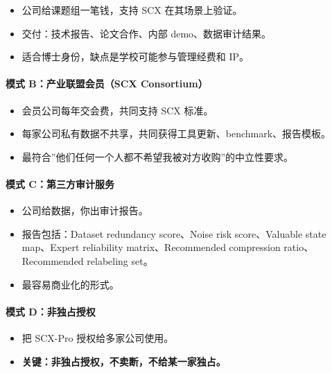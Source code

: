 \documentclass[
  12pt,
]{ctexart}
\providecommand{\tightlist}{%
  \setlength{\itemsep}{0pt}\setlength{\parskip}{0pt}}
\begin{document}
\begin{itemize}
\tightlist
\item
  公司给课题组一笔钱，支持 SCX 在其场景上验证。
\item
  交付：技术报告、论文合作、内部 demo、数据审计结果。
\item
  适合博士身份，缺点是学校可能参与管理经费和 IP。
\end{itemize}

\paragraph{模式 B：产业联盟会员（SCX
Consortium）}\label{ux6a21ux5f0f-bux4ea7ux4e1aux8054ux76dfux4f1aux5458scx-consortium}

\begin{itemize}
\tightlist
\item
  会员公司每年交会费，共同支持 SCX 标准。
\item
  每家公司私有数据不共享，共同获得工具更新、benchmark、报告模板。
\item
  最符合''他们任何一个人都不希望我被对方收购''的中立性要求。
\end{itemize}

\paragraph{模式
C：第三方审计服务}\label{ux6a21ux5f0f-cux7b2cux4e09ux65b9ux5ba1ux8ba1ux670dux52a1}

\begin{itemize}
\tightlist
\item
  公司给数据，你出审计报告。
\item
  报告包括：Dataset redundancy score、Noise risk score、Valuable state
  map、Expert reliability matrix、Recommended compression
  ratio、Recommended relabeling set。
\item
  最容易商业化的形式。
\end{itemize}

\paragraph{模式
D：非独占授权}\label{ux6a21ux5f0f-dux975eux72ecux5360ux6388ux6743}

\begin{itemize}
\tightlist
\item
  把 SCX-Pro 授权给多家公司使用。
\item
  \textbf{关键：非独占授权，不卖断，不给某一家独占。}
\end{itemize}
\end{document}

